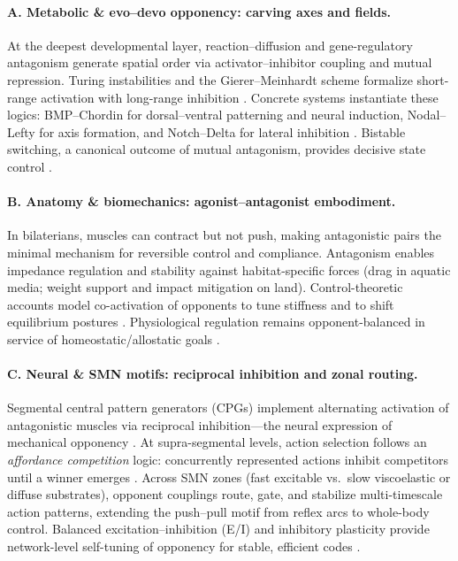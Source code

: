 \paragraph{A. Metabolic \& evo--devo opponency: carving axes and fields.}
At the deepest developmental layer, reaction--diffusion and gene-regulatory antagonism generate spatial order via activator--inhibitor coupling and mutual repression. Turing instabilities and the Gierer--Meinhardt scheme formalize short-range activation with long-range inhibition \citep{Turing1952_Morphogenesis,GiererMeinhardt1972_Pattern}. Concrete systems instantiate these logics: BMP--Chordin for dorsal--ventral patterning and neural induction, Nodal--Lefty for axis formation, and Notch--Delta for lateral inhibition \citep{DeRobertisKuroda2004_DVPatterning,Muller2012_NodalLefty,Collier1996_LateralInhibition}. Bistable switching, a canonical outcome of mutual antagonism, provides decisive state control \citep{FerrellMachleder1998_Bistability,Gardner2000_ToggleSwitch}.

\paragraph{B. Anatomy \& biomechanics: agonist--antagonist embodiment.}
In bilaterians, muscles can contract but not push, making antagonistic pairs the minimal mechanism for reversible control and compliance. Antagonism enables impedance regulation and stability against habitat-specific forces (drag in aquatic media; weight support and impact mitigation on land). Control-theoretic accounts model co-activation of opponents to tune stiffness and to shift equilibrium postures \citep{Hogan1984_ImpedanceControl,Feldman1986_EquilibriumPoint}. Physiological regulation remains opponent-balanced in service of homeostatic/allostatic goals \citep{Cannon1932_WisdomBody,Sterling2012_Allostasis}.

\paragraph{C. Neural \& SMN motifs: reciprocal inhibition and zonal routing.}
Segmental central pattern generators (CPGs) implement alternating activation of antagonistic muscles via reciprocal inhibition---the neural expression of mechanical opponency \citep{Sherrington1906_IntegrativeAction,Brown1911_Stepping,Grillner2006_LocomotorNetworks}. At supra-segmental levels, action selection follows an \emph{affordance competition} logic: concurrently represented actions inhibit competitors until a winner emerges \citep{Cisek2007_AffordanceCompetition,CisekKalaska2010_DecisionsAction}. Across SMN zones (fast excitable vs.\ slow viscoelastic or diffuse substrates), opponent couplings route, gate, and stabilize multi-timescale action patterns, extending the push--pull motif from reflex arcs to whole-body control. Balanced excitation--inhibition (E/I) and inhibitory plasticity provide network-level self-tuning of opponency for stable, efficient codes \citep{Vogels2011_InhibitoryPlasticity,DeneveMachens2016_EfficientCodes}.

